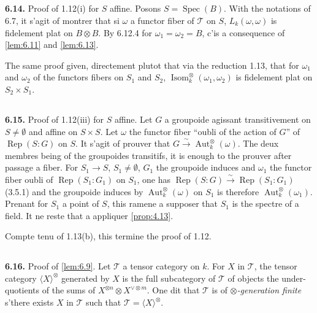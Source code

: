 \documentclass[12pt,a4paper]{article}
\theoremstyle{plain}
\theoremstyle{definition}
\theoremstyle{remark}
\DeclareMathOperator{\Aut}{Aut}
\DeclareMathOperator{\Isom}{Isom}
\DeclareMathOperator{\Spec}{Spec}
\DeclareMathOperator{\Rep}{Rep}
\begin{document}
\subsection{}

\textbf{6.14.} Proof of 1.12(i) for $S$ affine. Posons $S = \Spec(B)$. With the notations of 6.7, it s'agit of montrer that si $\omega$ a functor fiber of $\mathcal{T}$ on $S$, $L_k(\omega,\omega)$ is fidelement plat on $B \otimes B$. By 6.12.4 for $\omega_1 = \omega_2 = B$, c'is a consequence of \ref{lem:6.11} and \ref{lem:6.13}.

The same proof given, directement plutot that via the reduction 1.13, that for $\omega_1$ and $\omega_2$ of the functors fibers on $S_1$ and $S_2$, $\Isom^\otimes_k(\omega_1,\omega_2)$ is fidelement plat on $S_2 \times S_1$.

\subsection{}

\textbf{6.15.} Proof of 1.12(iii) for $S$ affine. Let $G$ a groupoide agissant transitivement on $S \neq \emptyset$ and affine on $S \times S$. Let $\omega$ the functor fiber ``oubli of the action of $G$'' of $\Rep(S:G)$ on $S$. It s'agit of prouver that $G \xrightarrow{\sim} \Aut^\otimes_k(\omega)$. The deux membres being of the groupoides transitifs, it is enough to the prouver after passage a fiber. For $S_1 \to S$, $S_1 \neq \emptyset$, $G_1$ the groupoide induces and $\omega_1$ the functor fiber oubli of $\Rep(S_1:G_1)$ on $S_1$, one has $\Rep(S:G) \xrightarrow{\sim} \Rep(S_1:G_1)$ (3.5.1) and the groupoide induces by $\Aut^\otimes_k(\omega)$ on $S_1$ is therefore $\Aut^\otimes_k(\omega_1)$. Prenant for $S_1$ a point of $S$, this ramene a supposer that $S_1$ is the spectre of a field. It ne reste that a appliquer \ref{prop:4.13}.

Compte tenu of 1.13(b), this termine the proof of 1.12.

\subsection{}

\textbf{6.16.} Proof of \ref{lem:6.9}. Let $\mathcal{T}$ a tensor category on $k$. For $X$ in $\mathcal{T}$, the tensor category $\langle X \rangle^\otimes$ generated by $X$ is the full subcategory of $\mathcal{T}$ of objects the under-quotients of the sums of $X^{\otimes n} \otimes X^{\vee \otimes m}$. One dit that $\mathcal{T}$ is of \emph{$\otimes$-generation finite} s'there exists $X$ in $\mathcal{T}$ such that $\mathcal{T} = \langle X \rangle^\otimes$.
\end{document}
